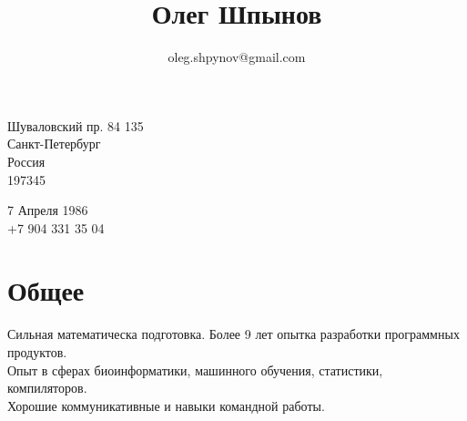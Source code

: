 \documentclass[10pt]{article}
\title{\bfseries\Huge Олег Шпынов}
\author{oleg.shpynov@gmail.com}
\date{}
\begin{document}
\maketitle
\vspace{1em}
\begin{minipage}[ht]{0.75\textwidth}
Шуваловский пр. 84 135\\
Санкт-Петербург\\
Россия\\
197345
\end{minipage}
\begin{minipage}[ht]{0.25\textwidth}
7 Апреля 1986\\
+7 904 331 35 04
\end{minipage}
\vspace{20pt}
 
\section*{Общее}
Сильная математическа подготовка. Более 9 лет опытка разработки программных продуктов.\\
Опыт в сферах биоинформатики, машинного обучения, статистики, компиляторов. \\
Хорошие коммуникативные и навыки командной работы.
 
\end{document}
